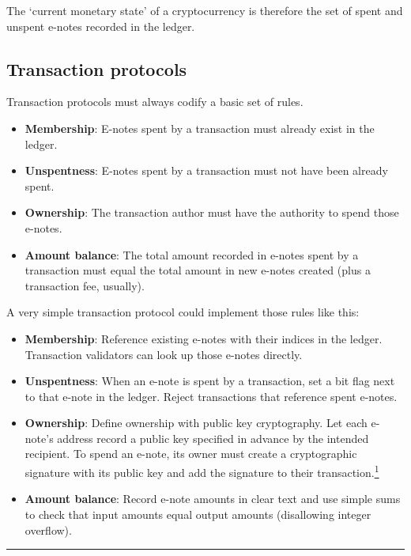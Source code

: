 The `current monetary state' of a cryptocurrency is therefore the set of spent and unspent e-notes recorded in the ledger.


\subsection{Transaction protocols}
\label{subsec:intro-transaction protocols}

Transaction protocols must always codify a basic set of rules.

\begin{itemize}
    \item \textbf{Membership}: E-notes spent by a transaction must already exist in the ledger.
    \item \textbf{Unspentness}: E-notes spent by a transaction must not have been already spent.
    \item \textbf{Ownership}: The transaction author must have the authority to spend those e-notes.
    \item \textbf{Amount balance}: The total amount recorded in e-notes spent by a transaction must equal the total amount in new e-notes created (plus a transaction fee, usually).
\end{itemize}

A very simple transaction protocol could implement those rules like this:

\begin{itemize}
    \item \textbf{Membership}: Reference existing e-notes with their indices in the ledger. Transaction validators can look up those e-notes directly.
    \item \textbf{Unspentness}: When an e-note is spent by a transaction, set a bit flag next to that e-note in the ledger. Reject transactions that reference spent e-notes.
    \item \textbf{Ownership}: Define ownership with public key cryptography. Let each e-note's address record a public key specified in advance by the intended recipient. To spend an e-note, its owner must create a cryptographic signature with its public key and add the signature to their transaction.\footnote{Cryptocurrencies have the `crypto' prefix because they use cryptography to control ownership of e-notes.}
    \item \textbf{Amount balance}: Record e-note amounts in clear text and use simple sums to check that input amounts equal output amounts (disallowing integer overflow).
\end{itemize}

